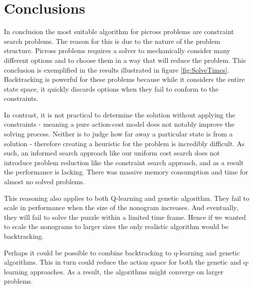 \documentclass{svproc}
\begin{document}
\section{Conclusions}
In conclusion the most suitable algorithm for picross problems are constraint search problems.
The reason for this is due to the nature of the problem structure. Picross problems requires a solver to mechanically consider many different options and to choose them in a way that will reduce the problem.
This conclusion is exemplified in the results illustrated in figure \ref{fig:SolveTimes}.
Backtracking is powerful for these problems because while it considers the entire state space, it quickly discards options when they fail to conform to the constraints.

In contrast, it is not practical to determine the solution without applying the constraints - meaning a pure action-cost model does not notably improve the solving process. Neither is to judge how far away a particular state is from a solution - therefore creating a heuristic for the problem is incredibly difficult. As such, an informed search approach like our uniform cost search does not introduce problem reduction like the constraint search approach, and as a result the performance is lacking. There was massive memory consumption and time for almost no solved problems.

This reasoning also applies to both Q-learning and genetic algorithm. They fail to scale in performance when the size of the nonogram increases. And eventually, they will fail to solve the puzzle within a limited time frame. Hence if we wanted to scale the nonograms to larger sizes the only realistic algorithm would be backtracking.

Perhaps it could be possible to combine backtracking to q-learning and genetic algorithms. This in turn could reduce the action space for both the genetic and q-learning approaches. As a result, the algorithms might converge on larger problems.
\end{document}
